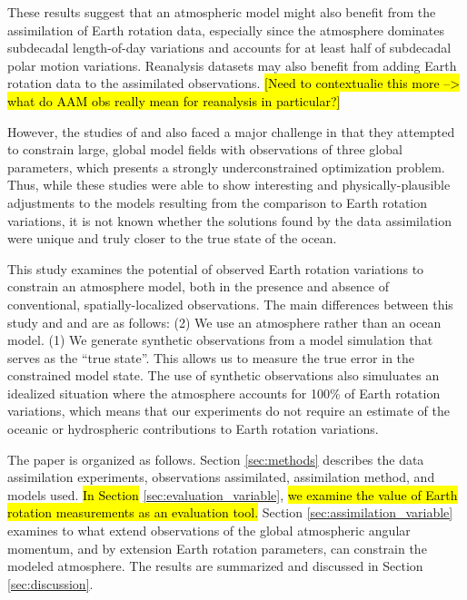 These results suggest that an atmospheric model might also benefit from the assimilation of Earth rotation data, especially since the atmosphere dominates subdecadal length-of-day variations and accounts for at least half of subdecadal polar motion variations. 
Reanalysis datasets may also benefit from adding Earth rotation data to the assimilated observations. 
\hl{[Need to contextualie this more --> what do AAM obs really mean for reanalysis in particular?]}

However, the studies of \citet{Saynisch2010,Saynisch2011} and \citet{Saynisch2012} also faced a major challenge in that they attempted to constrain large, global model fields with observations of three global parameters, which presents a strongly underconstrained optimization problem. 
Thus, while these studies were able to show interesting and physically-plausible adjustments to the models resulting from the comparison to Earth rotation variations, it is not known whether the solutions found by the data assimilation were unique and truly closer to the true state of the ocean.  

This study examines the potential of observed Earth rotation variations to constrain an atmosphere model, both in the presence and absence of conventional, spatially-localized observations. 
The main differences between this study and \citet{Saynisch2010,Saynisch2011} and \citet{Saynisch2012} are as follows: 
(2) We use an atmosphere rather than an ocean model.
(1) We generate synthetic observations from a model simulation that serves as the ``true state''. This allows us to measure the true error in the constrained model state. The use of synthetic observations also simuluates an idealized situation where the atmosphere accounts for 100\% of Earth rotation variations, which means that our experiments do not require an estimate of the oceanic or hydrospheric contributions to Earth rotation variations.  


The paper is organized as follows.  
Section \ref{sec:methods} describes the data assimilation experiments, observations assimilated, assimilation method, and models used.
\hl{In Section} \ref{sec:evaluation_variable}, \hl{we examine the value of Earth rotation measurements as an evaluation tool. } 
Section \ref{sec:assimilation_variable} examines to what extend observations of the global atmospheric angular momentum, and by extension Earth rotation parameters, can constrain the modeled atmosphere. 
The results are summarized and discussed in Section \ref{sec:discussion}.


